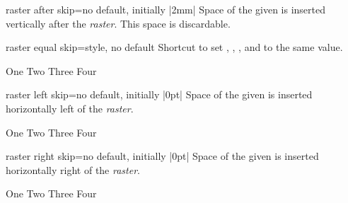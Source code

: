 \begin{docTcbKey}[][doc new and updated={2014-11-10}{2014-12-16}]{raster after skip}{=}{no default, initially |2mm|}
  Space of the given  is inserted vertically after the \emph{raster}.
  This space is discardable.
\end{docTcbKey}


\begin{docTcbKey}[][doc new=2015-01-08]{raster equal skip}{=}{style, no default}
  Shortcut to set
  ,
  ,
  , and
  to the same  value.
\begin{dispExample}
\begin{tcbitemize}[raster equal skip=4mm,
  size=small,colframe=red!50!black,colback=red!10!white]
  \tcbitem One
  \tcbitem Two
  \tcbitem Three
  \tcbitem Four
\end{tcbitemize}
\end{dispExample}
\end{docTcbKey}


\clearpage

\begin{docTcbKey}[][doc new=2014-11-10]{raster left skip}{=}{no default, initially |0pt|}
  Space of the given  is inserted horizontally left of the \emph{raster}.
\begin{dispExample}
\begin{tcbitemize}[raster left skip=2cm,
  size=small,colframe=red!50!black,colback=red!10!white]
  \tcbitem One
  \tcbitem Two
  \tcbitem Three
  \tcbitem Four
\end{tcbitemize}
\end{dispExample}
\end{docTcbKey}


\begin{docTcbKey}[][doc new=2014-11-10]{raster right skip}{=}{no default, initially |0pt|}
  Space of the given  is inserted horizontally right of the \emph{raster}.
\begin{dispExample}
\begin{tcbitemize}[raster right skip=2cm,
  size=small,colframe=red!50!black,colback=red!10!white]
  \tcbitem One
  \tcbitem Two
  \tcbitem Three
  \tcbitem Four
\end{tcbitemize}
\end{dispExample}
\end{docTcbKey}

